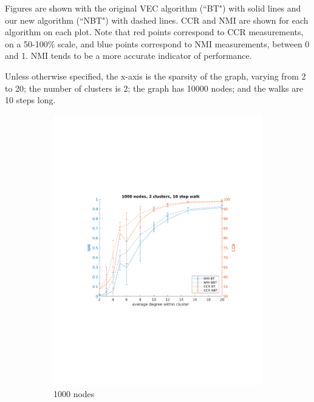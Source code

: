 \documentclass{article} %
\begin{document}
Figures are shown with the original VEC algorithm (``BT") with solid lines and our new algorithm (``NBT") with dashed lines. CCR and NMI are shown for each algorithm on each plot. Note that red points correspond to CCR measurements, on a 50-100\% scale, and blue points correspond to NMI measurements, between 0 and 1. NMI tends to be a more accurate indicator of performance.

Unless otherwise specified, the x-axis is the sparsity of the graph, varying from 2 to 20; the number of clusters is 2; the graph has 10000 nodes; and the walks are 10 steps long.

\begin{figure}[H] %
    \centering
    \begin{subfigure}{0.48\textwidth}
        \includegraphics[width=\linewidth]{fig1/N1000K2len10} 
        \caption{1000 nodes}
        \label{fig:subim11}
    \end{subfigure}
    \hfill
    \begin{subfigure}{0.48\textwidth}

\end{subfigure}
\end{figure}
\end{document}
